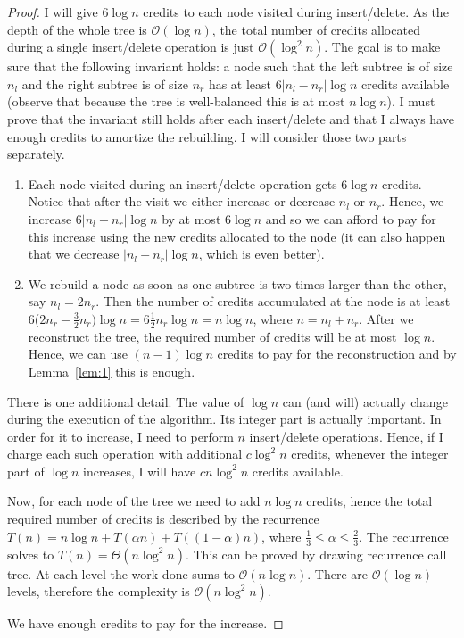 \documentclass[10pt,a4paper]{article}
\newcommand{\Oh}{\mathcal{O}}
\begin{document}
\begin{proof}

I will give $6\log n$ credits to each node visited during insert/delete. As the depth of the whole tree is $\Oh(\log n)$, the total number of credits allocated during a single insert/delete operation is just $\Oh(\log^{2}n)$. The goal is to make sure that the following invariant holds: a node such that the left subtree is of size $n_{l}$ and the right subtree is of size $n_{r}$ has at least $6|n_{l}-n_{r}|\log n$ credits available (observe that because the tree is well-balanced this is at most $n\log n$). I must prove that the invariant still holds after each insert/delete and that I always have enough credits to amortize the rebuilding. I will consider those two parts separately.

\begin{enumerate}

\item Each node visited during an insert/delete operation gets $6\log n$ credits. Notice that after the visit we either increase or decrease $n_{l}$ or $n_{r}$. Hence, we increase $6|n_{l}-n_{r}|\log n$ by at most $6\log n$ and so we can afford to pay for this increase using the new credits allocated to the node (it can also happen that we decrease $|n_{l}-n_{r}|\log n$, which is even better).

\item We rebuild a node as soon as one subtree is two times larger than the other, say $n_{l} = 2n_{r}$. Then the number of credits accumulated at the node is at least 6($2n_{r}-\frac{3}{2}n_{r}
)\log n = 6\frac{1}{2}n_{r}\log n = n\log n$, where $n=n_{l}+n_{r}$. After we reconstruct the tree, the required number of credits will be at most $\log n$. Hence, we can use $(n-1)\log n$ credits to pay for the reconstruction and by Lemma~\ref{lem:1} this is enough.

\end{enumerate}

There is one additional detail. The value of $\log n$ can (and will) actually change during the execution of the algorithm. Its integer part is actually important. In order for it to increase, I need to perform $n$ insert/delete operations. Hence, if I charge each such operation with additional $c\log^{2} n$ credits, whenever the integer part of $\log n$ increases, I will have $cn\log^{2} n$ credits available. 

Now, for each node of the tree we need to add $n\log n$ credits, hence the total required number of credits is described by the recurrence $T(n)=n\log n+T(\alpha n)+T((1-\alpha)n)$, where $\frac{1}{3}\leq \alpha \leq \frac{2}{3}$. The recurrence solves to $T(n)=\Theta(n\log^{2}n)$. This can be proved by drawing recurrence call tree. At each level the work done sums to $\Oh(n \log n)$. There are $\Oh(\log n)$ levels, therefore the complexity is $\Oh(n \log^2 n)$.

We have enough credits to pay for the increase.
\end{proof}
\end{document}
